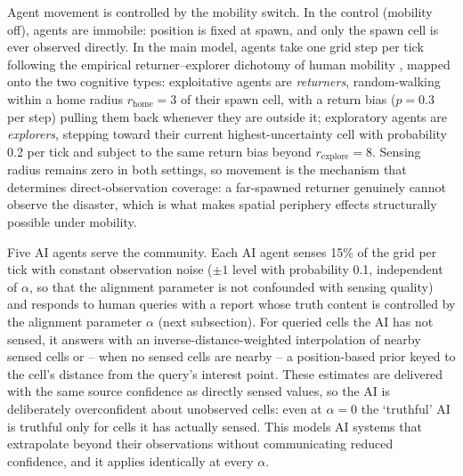 \documentclass[sn-apacite]{sn-jnl}
\begin{document}
Agent movement is controlled by the mobility switch. In the control (mobility off), agents are immobile: position is fixed at spawn, and only the spawn cell is ever observed directly. In the main model, agents take one grid step per tick following the empirical returner--explorer dichotomy of human mobility \citep{pappalardo2015returners}, mapped onto the two cognitive types: exploitative agents are \emph{returners}, random-walking within a home radius $r_{\text{home}} = 3$ of their spawn cell, with a return bias ($p = 0.3$ per step) pulling them back whenever they are outside it; exploratory agents are \emph{explorers}, stepping toward their current highest-uncertainty cell with probability 0.2 per tick and subject to the same return bias beyond $r_{\text{explore}} = 8$. Sensing radius remains zero in both settings, so movement is the mechanism that determines direct-observation coverage: a far-spawned returner genuinely cannot observe the disaster, which is what makes spatial periphery effects structurally possible under mobility.

Five AI agents serve the community. Each AI agent senses 15\% of the grid per tick with constant observation noise ($\pm 1$ level with probability 0.1, independent of $\alpha$, so that the alignment parameter is not confounded with sensing quality) and responds to human queries with a report whose truth content is controlled by the alignment parameter $\alpha$ (next subsection). For queried cells the AI has not sensed, it answers with an inverse-distance-weighted interpolation of nearby sensed cells or -- when no sensed cells are nearby -- a position-based prior keyed to the cell's distance from the query's interest point. These estimates are delivered with the same source confidence as directly sensed values, so the AI is deliberately overconfident about unobserved cells: even at $\alpha = 0$ the `truthful' AI is truthful only for cells it has actually sensed. This models AI systems that extrapolate beyond their observations without communicating reduced confidence, and it applies identically at every $\alpha$.
\end{document}
